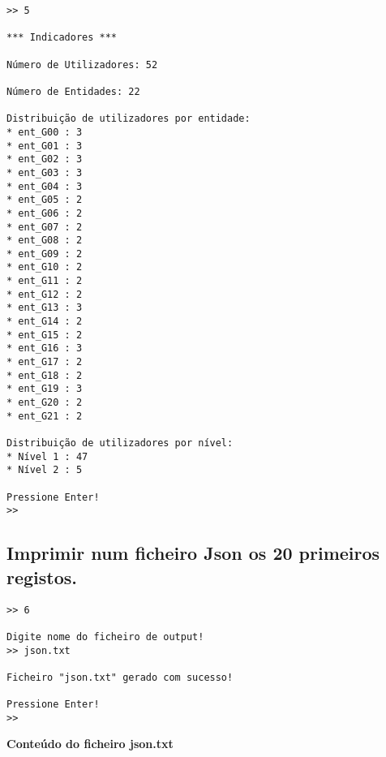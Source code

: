 \documentclass[11pt,a4paper]{report}%
\begin{document}
\begin{verbatim}
>> 5

*** Indicadores ***

Número de Utilizadores: 52

Número de Entidades: 22

Distribuição de utilizadores por entidade:
* ent_G00 : 3
* ent_G01 : 3
* ent_G02 : 3
* ent_G03 : 3
* ent_G04 : 3
* ent_G05 : 2
* ent_G06 : 2
* ent_G07 : 2
* ent_G08 : 2
* ent_G09 : 2
* ent_G10 : 2
* ent_G11 : 2
* ent_G12 : 2
* ent_G13 : 3
* ent_G14 : 2
* ent_G15 : 2
* ent_G16 : 3
* ent_G17 : 2
* ent_G18 : 2
* ent_G19 : 3
* ent_G20 : 2
* ent_G21 : 2

Distribuição de utilizadores por nível:
* Nível 1 : 47
* Nível 2 : 5

Pressione Enter!
>>
\end{verbatim}



\subsection{Imprimir num ficheiro Json os 20 primeiros registos.}

\begin{verbatim}
>> 6   

Digite nome do ficheiro de output!
>> json.txt

Ficheiro "json.txt" gerado com sucesso!

Pressione Enter!
>> 
\end{verbatim}

\textbf{Conteúdo do ficheiro json.txt}
\end{document}
